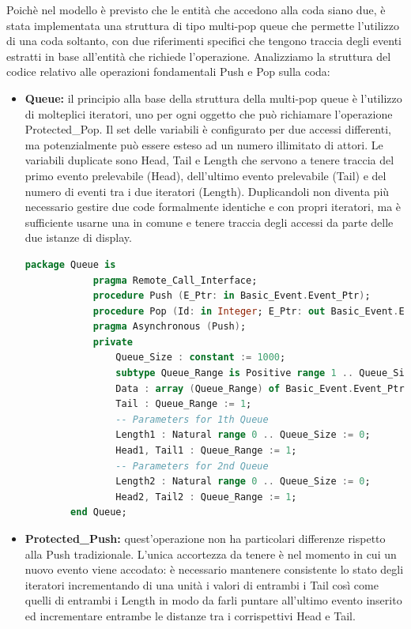 \documentclass[aps,letterpaper,10pt]{article}
\begin{document}
Poich\`e nel modello \`e previsto che le entit\`a che accedono alla coda siano due, \`e stata implementata una struttura
di tipo multi-pop queue che permette l'utilizzo di una coda soltanto, con due riferimenti specifici che tengono traccia
degli eventi estratti in base all'entit\`a che richiede l'operazione. Analizziamo la struttura del codice relativo alle
operazioni fondamentali Push e Pop sulla coda:

\begin{itemize}
\item \textbf{Queue:} il principio alla base della struttura della multi-pop queue \`e l'utilizzo di molteplici
iteratori, uno per ogni oggetto che pu\`o richiamare l'operazione Protected\_Pop. Il set delle variabili \`e configurato
per due accessi differenti, ma potenzialmente pu\`o essere esteso ad un numero illimitato di attori. Le variabili
duplicate sono Head, Tail e Length che servono a tenere traccia del primo evento prelevabile (Head), dell'ultimo evento
prelevabile (Tail) e del numero di eventi tra i due iteratori (Length). Duplicandoli non diventa pi\`u necessario
gestire due code formalmente identiche e con propri iteratori, ma \`e sufficiente usarne una in comune e tenere traccia
degli accessi da parte delle due istanze di display.
	
		\begin{lstlisting}[language=Ada]
		package Queue is
			pragma Remote_Call_Interface;
			procedure Push (E_Ptr: in Basic_Event.Event_Ptr);
		    procedure Pop (Id: in Integer; E_Ptr: out Basic_Event.Event_Ptr);
			pragma Asynchronous (Push);
			private
			    Queue_Size : constant := 1000;
			    subtype Queue_Range is Positive range 1 .. Queue_Size;
			    Data : array (Queue_Range) of Basic_Event.Event_Ptr;
				Tail : Queue_Range := 1;
				-- Parameters for 1th Queue
			    Length1 : Natural range 0 .. Queue_Size := 0;
			    Head1, Tail1 : Queue_Range := 1;
				-- Parameters for 2nd Queue
			    Length2 : Natural range 0 .. Queue_Size := 0;
			    Head2, Tail2 : Queue_Range := 1;
		end Queue;
		\end{lstlisting}	
	
\item \textbf{Protected\_Push:} quest'operazione non ha particolari differenze rispetto alla Push tradizionale. L'unica
accortezza da tenere \`e nel momento in cui un nuovo evento viene accodato: \`e necessario mantenere consistente lo
stato degli iteratori incrementando di una unit\`a i valori di entrambi i Tail cos\`i come quelli di entrambi i Length
in modo da farli puntare all'ultimo evento inserito ed incrementare entrambe le distanze tra i corrispettivi Head e
Tail.
	

\end{itemize}
\end{document}
